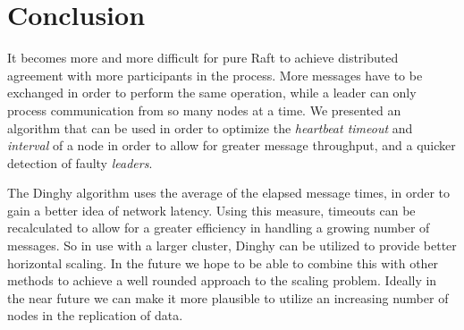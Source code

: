\section{Conclusion}

It becomes more and more difficult for pure Raft to achieve distributed agreement with more participants in the process. More messages have to be exchanged in order to perform the same operation, while a leader can only process communication from so many nodes at a time. We presented an algorithm that can be used in order to optimize the \textit{heartbeat timeout} and \textit{interval} of a node in order to allow for greater message throughput, and a quicker detection of faulty \textit{leaders}.

The Dinghy algorithm uses the average of the elapsed message times, in order to gain a better idea of network latency. Using this measure, timeouts can be recalculated to allow for a greater efficiency in handling a growing number of messages. So in use with a larger cluster, Dinghy can be utilized to provide better horizontal scaling. In the future we hope to be able to combine this with other methods to achieve a well rounded approach to the scaling problem. Ideally in the near future we can make it more plausible to utilize an increasing number of nodes in the replication of data.